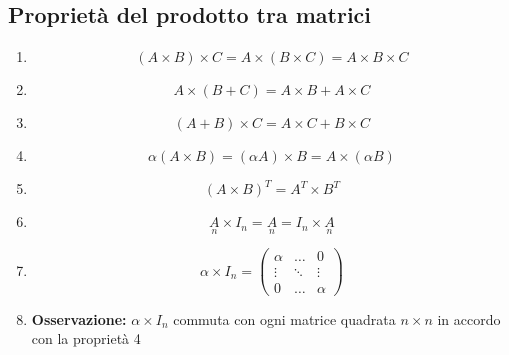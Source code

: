 \documentclass[a4paper]{article}
\begin{document}
\subsection[Proprietà prodotto matriciale]{Proprietà del prodotto tra matrici}
\begin{enumerate}
	\item
	\begin{equation*}
		(A \times B) \times C = A \times (B \times C) =  A \times B \times C
	\end{equation*}
	
	\item
	\begin{equation*}
			A \times (B+C)=A \times B + A \times C
	\end{equation*}

	\item
	\begin{equation*}
		(A+B)\times C=A \times C + B \times C
	\end{equation*}

	\item
	\begin{equation*}
		\alpha (A \times B) = (\alpha A) \times B = A \times (\alpha B)
	\end{equation*}
	
	\item
	\begin{equation*}
		(A \times B)^T = A^T \times B^T
	\end{equation*}
	
	\item
	\begin{equation*}
		\underset{n}{A} \times I_n = \underset{n}{A} = I_n \times \underset{n}{A}
	\end{equation*}
	
	\item
	\begin{equation*}
		\alpha \times I_n = \begin{pmatrix}
			\alpha & \dots & 0 \\
			\vdots & \ddots & \vdots \\
			0 & \dots & \alpha
		\end{pmatrix}
	\end{equation*}

	\item
	\textbf{Osservazione: } $\alpha \times I_n$ commuta con ogni matrice quadrata $n\times n$ in accordo con la proprietà 4
\end{enumerate}
\end{document}
